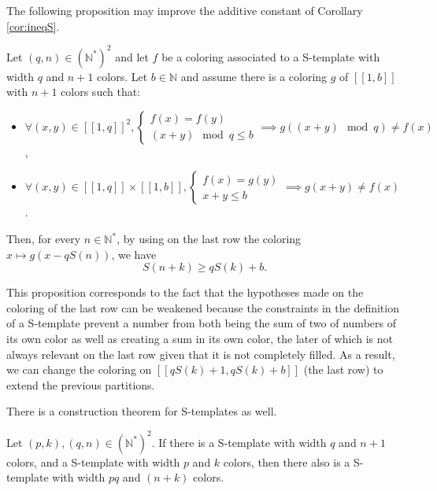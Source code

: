 The following proposition may improve the additive constant of Corollary \ref{cor:ineqS}.

\begin{proposition}
\label{prop:rafStemp}
Let \((q, n) \in \left(\mathbb{N}^* \right)^2\) and let \(f\) be a coloring associated to a S-template with width \(q\) and \(n+1\) 
colors. Let \(b \in \mathbb{N}\) and assume there is a coloring \(g\) of 
\([\![1, b]\!]\) with \(n+1\) colors such that:
	
\begin{itemize}
\item \(\forall (x, y) \in [\![1, q]\!]^2, \left\{
	\begin{array}{l}
		f(x) = f(y) \\
		(x + y) \mod q \leqslant b
	\end{array}
	\right. \implies g((x + y) \mod q) \neq f(x)\),
\item \(\forall (x, y) \in [\![1, q]\!] \times  [\![1, b]\!],  \left\{
	\begin{array}{l}
		f(x) = g(y) \\
		x + y \leqslant b
	\end{array}
	\right. \implies g(x + y) \neq f(x)\).
\end{itemize}
	
Then, for every \(n \in \mathbb{N}^*\), by using on the last row the coloring \(x \longmapsto g(x - q S(n))\), we have
\[ S(n+k) \geqslant q S(k) + b.\]
\end{proposition}
This proposition corresponds to the fact that the hypotheses made on the coloring of the last row can be weakened because 
the constraints in the definition of a S-template prevent a number from both being the sum of two of numbers of its own color 
as well as creating a sum in its own color, the later of which is not always relevant on the last row given that it is not completely filled.
As a result, we can change the coloring on \([\![ q S(k) + 1,  q S(k) + b]\!]\) (the last row) to extend the previous partitions.
\newline

There is a construction theorem for S-templates as well.

\begin{theorem}
	Let \((p,k), (q,n) \in (\mathbb{N}^*)^2\). If there is a S-template with width \(q\) and \(n+1\) colors,
	and a S-template with width \(p\) and \(k\) colors, then there also is a S-template with width \(pq\) and \((n+k)\) 
	colors.
	\end{theorem}
	
